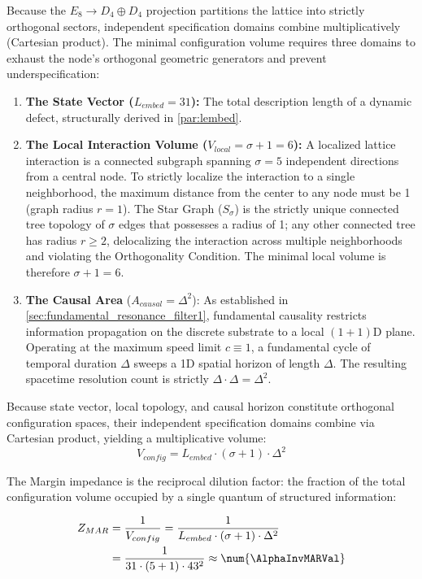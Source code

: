 Because the $E_8 \to D_4 \oplus D_4$ projection partitions the lattice into strictly orthogonal sectors, independent specification domains combine multiplicatively (Cartesian product). The minimal configuration volume requires three domains to exhaust the node's orthogonal geometric generators and prevent underspecification:
\begin{enumerate}
    \item \textbf{The State Vector ($L_{embed} = 31$):} The total description length of a dynamic defect, structurally derived in \cref{par:lembed}.
    \item \textbf{The Local Interaction Volume ($V_{local} = \sigma + 1 = 6$):} A localized lattice interaction is a connected subgraph spanning $\sigma = 5$ independent directions from a central node. To strictly localize the interaction to a single neighborhood, the maximum distance from the center to any node must be 1 (graph radius $r=1$). The Star Graph ($S_\sigma$) is the strictly unique connected tree topology of $\sigma$ edges that possesses a radius of 1; any other connected tree has radius $r \ge 2$, delocalizing the interaction across multiple neighborhoods and violating the Orthogonality Condition. The minimal local volume is therefore $\sigma+1=6$.
    \item \textbf{The Causal Area} ($A_{causal} = \Delta^2$): As established in \cref{sec:fundamental_resonance_filter1}, fundamental causality restricts information propagation on the discrete substrate to a local $(1+1)$D plane. Operating at the maximum speed limit $c \equiv 1$, a fundamental cycle of temporal duration $\Delta$ sweeps a 1D spatial horizon of length $\Delta$. The resulting spacetime resolution count is strictly $\Delta \cdot \Delta = \Delta^2$.
\end{enumerate}

Because state vector, local topology, and causal horizon constitute orthogonal configuration spaces, their independent specification domains combine via Cartesian product, yielding a multiplicative volume:
\begin{equation}
    V_{config} = L_{embed} \cdot (\sigma + 1) \cdot \Delta^2
\end{equation}

The Margin impedance is the reciprocal dilution factor: the fraction of the total configuration volume occupied by a single quantum of structured information:

\begin{equation}
\begin{split}
    Z_{MAR} &= \frac{1}{V_{config}} = \frac{1}{L_{embed} \cdot (\sigma + 1) \cdot \Delta^2} \\
    &=\frac{1}{31 \cdot (5+1) \cdot 43^2} \approx \num{\AlphaInvMARVal}
\end{split}
\end{equation}

